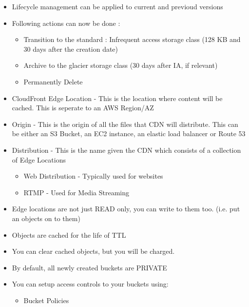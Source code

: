 \documentclass{article}
\begin{document}
\begin{itemize}
\item
Lifecycle management can be applied to current and previoud versions

\item
Following actions can now be done :
	\begin{itemize}
	\item
	Transition to the standard : Infrequent access storage class (128 KB and 30 days after the creation date)
	
	\item
	Archive to the glacier storage class (30 days after IA, if relevant)
	
	\item
	Permanently Delete
	\end{itemize}

\item
CloudFront Edge Location - This is the location where content will be cached. This is seperate to an AWS Region/AZ

\item
Origin - This is the origin of all the files that CDN will distribute. This can be either an S3 Bucket, an EC2 instance, an elastic load balancer or Route 53

\item
Distribution - This is the name given the CDN which consists of a collection of Edge Locations
	\begin{itemize}
	\item
	Web Distribution - Typically used for websites
	
	\item
	RTMP - Used for Media Streaming
	\end{itemize}
	
\item
Edge locations are not just READ only, you can write to them too. (i.e. put an objects on to them)

\item
Objects are cached for the life of TTL

\item
You can clear cached objects, but you will be charged.

\item
By default, all newly created buckets are PRIVATE

\item
You can setup access controls to your buckets using:
	\begin{itemize}
	\item
	Bucket Policies
	

\end{itemize}
\end{itemize}
\end{document}
